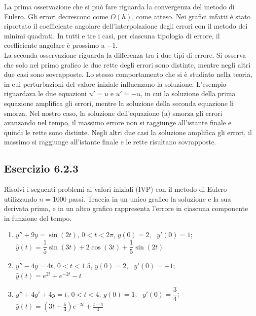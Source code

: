 \documentclass[letterpaper, 12pt]{article}
\numberwithin{equation}{section}    %
\begin{document}
La prima osservazione che si può fare riguarda la convergenza del metodo di Eulero.
Gli errori decrescono come $O(h)$, come atteso. 
Nei grafici infatti è stato riportato il coefficiente
angolare dell'interpolazione degli errori con il metodo dei minimi quadrati. In tutti e tre i casi, per ciascuna
tipologia di errore, il coefficiente angolare è prossimo a $-1$. \\
La seconda osservazione riguarda la differenza tra i due tipi di errore. Si osserva che solo nel primo grafico 
le due rette degli errori sono distinte, mentre negli altri due casi sono sovrapposte. Lo stesso 
comportamento che si è studiato nella teoria, in cui perturbazioni del valore iniziale influenzano la soluzione.
L'esempio riguardava le due equazioni $u' = u$ e $u' = -u $, in cui la soluzione
della prima equazione amplifica gli errori, mentre la soluzione della seconda equazione li smorza. 
Nel nostro caso, la soluzione dell'equazione (a) smorza gli errori avanzando nel tempo, il massimo 
errore non si raggiunge all'istante finale e quindi le rette sono distinte.
Negli altri due casi la soluzione amplifica gli errori, il massimo si raggiunge all'istante finale e le rette
risultano sovrapposte.

\subsection{Esercizio 6.2.3}
Risolvi i seguenti problemi ai valori iniziali (IVP) con il metodo di Eulero utilizzando $n=1000$ passi. 
Traccia in un unico grafico la soluzione e la sua derivata prima, e in un altro grafico rappresenta l'errore 
in ciascuna componente in funzione del tempo.\\
\begin{enumerate}[label=(\alph*)]
    \item $y''+ 9y = \sin(2t)$, \quad $0< t< 2\pi$, \quad $y(0) = 2$, \ $y'(0) = 1$;\\[2pt]
    \hspace*{1.5em} $\hat{y}(t) = \dfrac{1}{5} \sin(3t) + 2 \cos (3t) + \dfrac{1}{5} \sin (2t)$
    \item $y''- 4y = 4t$, \quad $0< t< 1.5$, \quad $y(0) = 2$, \ $y'(0) = -1$;\\[2pt]
    \hspace*{1.5em} $\hat{y}(t) = e^{2t} + e^{-2t} - t$
    \item $y''+ 4y'+ 4y = t$, \quad $0< t< 4$, \quad $y(0) = 1$, \ $y'(0) = \dfrac{3}{4}$;\\[2pt]
    \hspace*{1.5em} $\hat{y}(t) = (3t+\frac{5}{4})e^{-2t} + \frac{t-1}{4}$
\end{enumerate}
\end{document}
